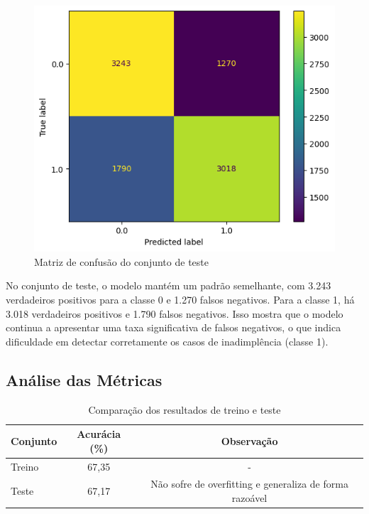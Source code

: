 \documentclass{abntpuc}
\begin{document}
\begin{figure}[H]
    \centering
    \includegraphics[width=\textwidth]{grafico12.png}
    \caption{Matriz de confusão do conjunto de teste}
\end{figure}

No conjunto de teste, o modelo mantém um padrão semelhante, com 3.243 verdadeiros positivos para a classe 0 e 1.270 falsos negativos. Para a classe 1, há 3.018 verdadeiros positivos e 1.790 falsos negativos. Isso mostra que o modelo continua a apresentar uma taxa significativa de falsos negativos, o que indica dificuldade em detectar corretamente os casos de inadimplência (classe 1).

\subsection*{\centering\large\textbf{Análise das Métricas}}

\begin{table}[H]
\centering
\begin{tabular}{lcc}
\toprule
Conjunto & Acurácia (\%) & Observação \\
\midrule
Treino & 67,35 & - \\
Teste & 67,17 & Não sofre de overfitting e generaliza de forma razoável \\
\bottomrule
\end{tabular}
\caption{Comparação dos resultados de treino e teste}
\label{tab:comparacao_resultados}
\end{table}
\end{document}
